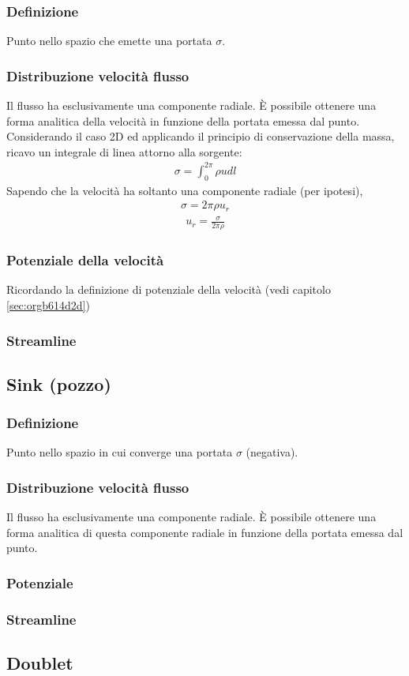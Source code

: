 \documentclass[11pt]{article}
\begin{document}
\subsubsection{Definizione}
\label{sec:orgcf66bd0}
Punto nello spazio che emette una portata \(\sigma\).
\subsubsection{Distribuzione velocità flusso}
\label{sec:org6b2dae1}
Il flusso ha esclusivamente una componente radiale. È possibile ottenere una forma analitica della velocità in funzione della portata emessa dal punto. Considerando il caso 2D ed applicando il principio di conservazione della massa, ricavo un integrale di linea attorno alla sorgente:
\begin{gather*}
    \sigma = \int_{0}^{2\pi}{\rho u dl}
\end{gather*}
Sapendo che la velocità ha soltanto una componente radiale (per ipotesi),
\begin{gather*}
    \sigma = 2 \pi \rho u_r
\end{gather*}
\begin{gather*}
    u_r = \frac{\sigma}{2 \pi \rho}
\end{gather*}
\subsubsection{Potenziale della velocità}
\label{sec:org7cd008b}
Ricordando la definizione di potenziale della velocità  (vedi capitolo \ref{sec:orgb614d2d})
\subsubsection{Streamline}
\label{sec:orgce9c3e3}
\subsection{Sink (pozzo)}
\label{sec:org8e94455}
\subsubsection{Definizione}
\label{sec:org3c0e2d0}
Punto nello spazio in cui converge una portata \(\sigma\) (negativa).
\subsubsection{Distribuzione velocità flusso}
\label{sec:orgdabaff9}
Il flusso ha esclusivamente una componente radiale. È possibile ottenere una forma analitica di questa componente radiale in funzione della portata emessa dal punto.
\subsubsection{Potenziale}
\label{sec:org1f0e7f4}
\subsubsection{Streamline}
\label{sec:org57a8b81}
\subsection{Doublet}
\label{sec:orgc12bb1e}
\end{document}
